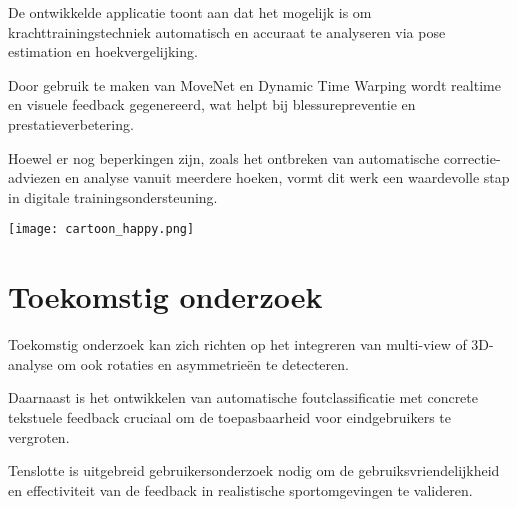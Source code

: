\documentclass[a0,portrait]{hogent-poster}
\begin{document}
\begin{multicols}{2}
\noindent
\begin{minipage}[t]{0.48\linewidth}
 
De ontwikkelde applicatie toont aan dat het mogelijk is om krachttrainingstechniek automatisch en accuraat te analyseren via pose estimation en hoekvergelijking. 

Door gebruik te maken van MoveNet en Dynamic Time Warping wordt realtime en visuele feedback gegenereerd, wat helpt bij blessurepreventie en prestatieverbetering. 

Hoewel er nog beperkingen zijn, zoals het ontbreken van automatische correctie-adviezen en analyse vanuit meerdere hoeken, vormt dit werk een waardevolle stap in digitale trainingsondersteuning.

\end{minipage}
\hfill
\begin{minipage}[t]{0.48\linewidth}  
\texttt{[image: cartoon\_happy.png]}
\end{minipage}
\vspace{1em}

\section{Toekomstig onderzoek}

Toekomstig onderzoek kan zich richten op het integreren van multi-view of 3D-analyse om ook rotaties en asymmetrieën te detecteren. 

Daarnaast is het ontwikkelen van automatische foutclassificatie met concrete tekstuele feedback cruciaal om de toepasbaarheid voor eindgebruikers te vergroten. 

Tenslotte is uitgebreid gebruikersonderzoek nodig om de gebruiksvriendelijkheid en effectiviteit van de feedback in realistische sportomgevingen te valideren.

\end{multicols}
\end{document}
